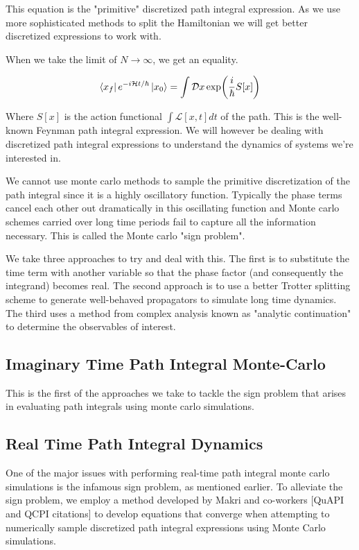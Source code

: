 This equation is the "primitive" discretized path integral expression. As we use more sophisticated methods to split the Hamiltonian we will get better discretized expressions to work with.

When we take the limit of $N \to \infty$, we get an equality.  

\begin{equation}
    \bra{x_f} e^{-i\mathcal{H}t/\hbar}\ket{x_0} = \int \mathcal{D}x \exp(\frac{i}{\hbar} S[x])
\end{equation}

Where $S[x]$ is the action functional $\int \mathcal{L}[x, t] dt$ of the path. This is the well-known Feynman path integral expression. We will however be dealing with discretized path integral expressions to understand the dynamics of systems we're interested in.

We cannot use monte carlo methods to sample the primitive discretization of the path integral since it is a highly oscillatory function. Typically the phase terms cancel each other out dramatically in this oscillating function and Monte carlo schemes carried over long time periods fail to capture all the information necessary. This is called the Monte carlo "sign problem".

We take three approaches to try and deal with this. The first is to substitute the time term with another variable so that the phase factor (and consequently the integrand) becomes real. The second approach is to use a better Trotter splitting scheme to generate well-behaved propagators to simulate long time dynamics. The third uses a method from complex analysis known as "analytic continuation" to determine the observables of interest.

\subsection{Imaginary Time Path Integral Monte-Carlo}

This is the first of the approaches we take to tackle the sign problem that arises in evaluating path integrals using monte carlo simulations. 




\subsection{Real Time Path Integral Dynamics}


One of the major issues with performing real-time path integral monte carlo simulations is the infamous sign problem, as mentioned earlier. 
To alleviate the sign problem, we employ a method developed by Makri and co-workers [QuAPI and QCPI citations]  to develop equations that converge when attempting to numerically sample discretized path integral expressions using Monte Carlo simulations.

